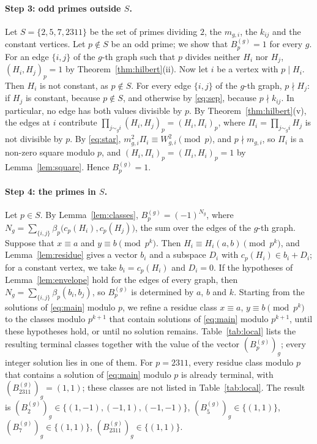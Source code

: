 \documentclass[11pt]{article}
\begin{document}
\paragraph{Step 3: odd primes outside $S$.} Let $S=\{2,5,7,2311\}$ be the set of primes dividing $2$, the $m_{g,i}$, the $k_{ij}$ and the constant vertices. Let $p\notin S$ be an odd prime; we show that $B^{(g)}_p=1$ for every $g$. For an edge $\{i,j\}$ of the $g$-th graph such that $p$ divides neither $H_i$ nor $H_j$, $(H_i,H_j)_p=1$ by Theorem~\ref{thm:hilbert}(ii). Now let $i$ be a vertex with $p\mid H_i$. Then $H_i$ is not constant, as $p\notin S$. For every edge $\{i,j\}$ of the $g$-th graph, $p\nmid H_j$: if $H_j$ is constant, because $p\notin S$, and otherwise by \eqref{eq:sep}, because $p\nmid k_{ij}$. In particular, no edge has both values divisible by $p$. By Theorem~\ref{thm:hilbert}(v), the edges at $i$ contribute $\prod_{j\sim_g i}(H_i,H_j)_p=(H_i,\Pi_i)_p$, where $\Pi_i=\prod_{j\sim_g i}H_j$ is not divisible by $p$. By \eqref{eq:star}, $m_{g,i}^2\Pi_i\equiv W_{g,i}^2\pmod p$, and $p\nmid m_{g,i}$, so $\Pi_i$ is a non-zero square modulo $p$, and $(H_i,\Pi_i)_p=(\Pi_i,H_i)_p=1$ by Lemma~\ref{lem:square}. Hence $B^{(g)}_p=1$.

\paragraph{Step 4: the primes in $S$.} Let $p\in S$. By Lemma~\ref{lem:classes}, $B^{(g)}_p=(-1)^{N_g}$, where $N_g=\sum_{\{i,j\}}\beta_p\bigl(c_p(H_i),c_p(H_j)\bigr)$, the sum over the edges of the $g$-th graph. Suppose that $x\equiv a$ and $y\equiv b\pmod{p^k}$. Then $H_i\equiv H_i(a,b)\pmod{p^k}$, and Lemma~\ref{lem:residue} gives a vector $b_i$ and a subspace $D_i$ with $c_p(H_i)\in b_i+D_i$; for a constant vertex, we take $b_i=c_p(H_i)$ and $D_i=0$. If the hypotheses of Lemma~\ref{lem:envelope} hold for the edges of every graph, then $N_g=\sum_{\{i,j\}}\beta_p(b_i,b_j)$, so $B^{(g)}_p$ is determined by $a$, $b$ and $k$. Starting from the solutions of \eqref{eq:main} modulo $p$, we refine a residue class $x\equiv a$, $y\equiv b\pmod{p^k}$ to the classes modulo $p^{k+1}$ that contain solutions of \eqref{eq:main} modulo $p^{k+1}$, until these hypotheses hold, or until no solution remains. Table~\ref{tab:local} lists the resulting terminal classes together with the value of the vector $(B^{(g)}_p)_g$; every integer solution lies in one of them. For $p=2311$, every residue class modulo $p$ that contains a solution of \eqref{eq:main} modulo $p$ is already terminal, with $(B^{(g)}_{2311})_g=(1,1)$; these classes are not listed in Table~\ref{tab:local}. The result is $(B^{(g)}_{2})_g\in\{(1,-1),\allowbreak (-1,1),\allowbreak (-1,-1)\}$, $(B^{(g)}_{5})_g\in\{(1,1)\}$, $(B^{(g)}_{7})_g\in\{(1,1)\}$, $(B^{(g)}_{2311})_g\in\{(1,1)\}$.
\end{document}
